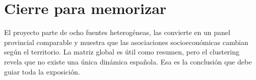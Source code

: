 \documentclass[11pt,a4paper]{article}
\begin{document}
\section*{Cierre para memorizar}
El proyecto parte de ocho fuentes heterogéneas, las convierte en un panel provincial comparable y muestra que las asociaciones socioeconómicas cambian según el territorio. La matriz global es útil como resumen, pero el clustering revela que no existe una única dinámica española. Esa es la conclusión que debe guiar toda la exposición.
\end{document}
